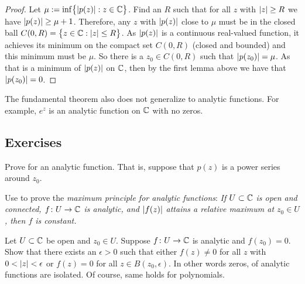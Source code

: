 \begin{proof}
Let $\mu := \inf \bigl\{ \lvert {p(z)} \rvert : z \in {\mathbb{C}} \bigr\}$.  Find an $R$ such that
for all $z$ with $\lvert {z} \rvert \geq R$ we have $\lvert {p(z)} \rvert \geq \mu+1$.
Therefore, any $z$ with $\lvert {p(z)} \rvert$ close to $\mu$ must be in the
closed ball $C(0,R) = \bigl\{ z \in {\mathbb{C}} : \lvert {z} \rvert \leq R \bigr\}$.  As $\lvert {p(z)} \rvert$
is a continuous real-valued function, it achieves its minimum
on the compact set $C(0,R)$ (closed and bounded) and this minimum must
be $\mu$.  So there is a $z_0 \in C(0,R)$ such that $\lvert {p(z_0)} \rvert = \mu$.
As that is a minimum of $\lvert {p(z)} \rvert$ on ${\mathbb{C}}$, then by the first lemma above we have
that $\lvert {p(z_0)} \rvert = 0$.
\end{proof}

The fundamental theorem also does not generalize to analytic functions.  For example,
$e^{z}$ is an analytic function on ${\mathbb{C}}$ with no zeros.

\subsection{Exercises}

\begin{exercise} \label{exercise:minprinciple}
Prove  for an analytic function.  That
is, suppose that $p(z)$ is a power series around $z_0$.
\end{exercise}

\begin{exercise}
Use  to prove the \emph{maximum
principle for analytic functions}:
\emph{If $U \subset {\mathbb{C}}$ is open and connected,
$f \colon U \to {\mathbb{C}}$ is analytic, and $\lvert {f(z)} \rvert$ attains a relative
maximum at $z_0 \in U$, then $f$ is constant.}
\end{exercise}

\begin{exercise}
Let $U \subset {\mathbb{C}}$ be open and $z_0 \in U$.
Suppose $f \colon U \to {\mathbb{C}}$ is analytic and $f(z_0) = 0$.  Show that
there exists an $\epsilon > 0$ such that either
$f(z) \not= 0$ for all $z$ with $0 < \lvert {z} \rvert < \epsilon$
or $f(z) = 0$ for all $z \in B(z_0,\epsilon)$.
In other words zeros, of analytic functions are isolated.
Of course, same holds for polynomials.
\end{exercise}

